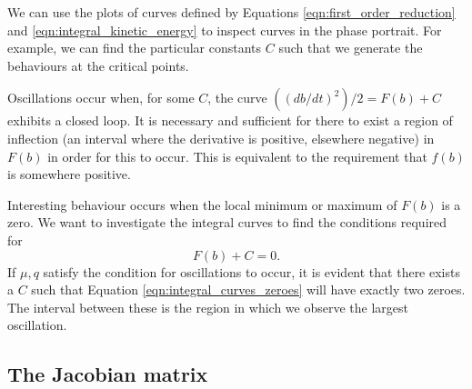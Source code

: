 \documentclass{report}
\begin{document}
We can use the plots of curves defined by Equations \ref{eqn:first_order_reduction} and \ref{eqn:integral_kinetic_energy} to inspect curves in the phase portrait.
For example, we can find the particular constants $C$ such that we generate the behaviours at the critical points.


Oscillations occur when, for some $C$, the curve $\left((db/dt)^2\right)/2 = F(b) + C$ exhibits a closed loop.
It is necessary and sufficient for there to exist a region of inflection (an interval where the derivative is positive,
elsewhere negative) in $F(b)$ in order for this to occur.
This is equivalent to the requirement that $f(b)$ is somewhere positive.

Interesting behaviour occurs when the local minimum or maximum of $F(b)$ is a zero.
We want to investigate the integral curves to find the conditions required for
\begin{equation}
	F(b) + C = 0.
	\label{eqn:integral_curves_zeroes}
\end{equation}
If $\mu, q$ satisfy the condition for oscillations to occur,
it is evident that there exists a $C$ such that Equation \ref{eqn:integral_curves_zeroes} will have exactly two zeroes.
The interval between these is the region in which we observe the largest oscillation.

\subsection{The Jacobian matrix}
\end{document}
